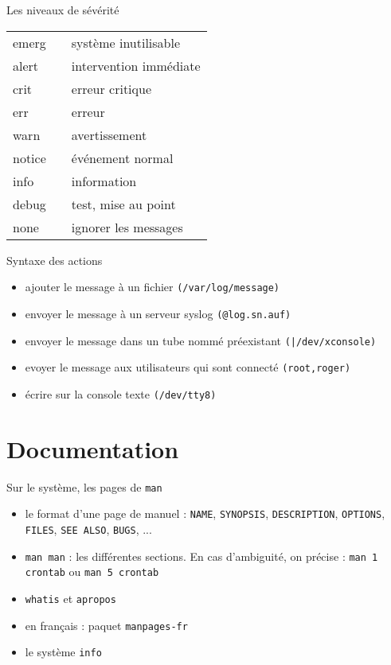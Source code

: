 \documentclass[french]{beamer}
\begin{document}
\begin{frame}
\begin{block}{Les niveaux de sévérité}
\begin{tabular}{l l l}
emerg & & système inutilisable \\
alert & & intervention immédiate\\
crit & & erreur critique\\
err & & erreur\\
warn & & avertissement \\ 
notice & & événement normal \\
info & & information \\
debug & & test, mise au point \\
none & & ignorer les messages \\
\end{tabular}
\end{block}
\end{frame}

\begin{frame}
\begin{block}{Syntaxe des actions}
\begin{itemize}
\item ajouter le message à un fichier \texttt{(/var/log/message)}
\item envoyer le message à un serveur syslog \texttt{(@log.sn.auf)}
\item envoyer le message dans un tube nommé préexistant \texttt{(|/dev/xconsole)}
\item evoyer le message aux utilisateurs qui sont connecté \texttt{(root,roger)}
\item écrire sur la console texte \texttt{(/dev/tty8)}
\end{itemize}
\end{block}
\end{frame}



\section{Documentation} 
\frame{\tableofcontents[current]}

\begin{frame}
Sur le système, les pages de \texttt{man}
\begin{itemize}
    \item le format d'une page de manuel : \texttt{NAME}, \texttt{SYNOPSIS}, \texttt{DESCRIPTION},  \texttt{OPTIONS}, \texttt{FILES}, \texttt{SEE ALSO}, \texttt{BUGS}, ...
    \item \texttt{man man} : les différentes sections. En cas d'ambiguité, on précise : \texttt{man 1 crontab} ou \texttt{man 5 crontab}
    \item \texttt{whatis} et \texttt{apropos}
    \item en français : paquet \texttt{manpages-fr}
    \item le système \texttt{info}
\end{itemize}
\end{frame}
\end{document}
